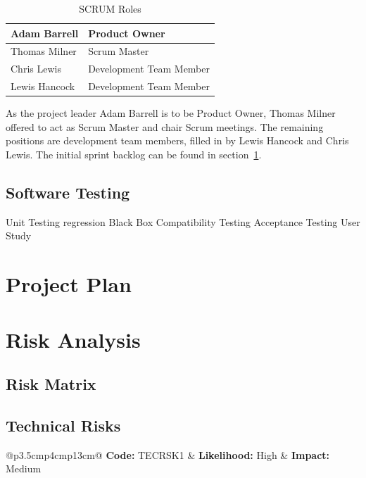 \documentclass[11pt,a4paper]{article}
\renewcommand{\arraystretch}{1.5}
\begin{document}
\begin{table}[H]
\centering
\begin{tabular}{|l|l|}
\hline
Adam Barrell & Product Owner \\ \hline
Thomas Milner & Scrum Master \\ \hline
Chris Lewis & Development Team Member \\ \hline
Lewis Hancock & Development Team Member \\ \hline
\end{tabular}
\caption{SCRUM Roles}
\label{tab:scrumRoles}
\end{table}

As the project leader Adam Barrell is to be Product Owner, Thomas Milner offered to act as Scrum Master and chair Scrum meetings. The remaining positions are development team members, filled in by Lewis Hancock and Chris Lewis. The initial sprint backlog can be found in section~\ref{sec:project-plan}.

\subsection{Software Testing}
Unit Testing
	regression
	Black Box
Compatibility Testing
Acceptance Testing
User Study

\section{Project Plan}
\label{sec:project-plan}

\section{Risk Analysis}
\label{sec:risk-analysis}

\subsection{Risk Matrix}

\subsection{Technical Risks}
\label{sec:tech-risks}

\renewcommand{\arraystretch}{1.2}

\noindent\begin{tabular}{@{}p{3.5cm}p{4cm}p{13cm}@{}}
\textbf{Code:} TECRSK1 & \textbf{Likelihood:} High & \textbf{Impact:} Medium \\ 
 \\ 
 \\ 
\end{tabular} 
\end{document}
